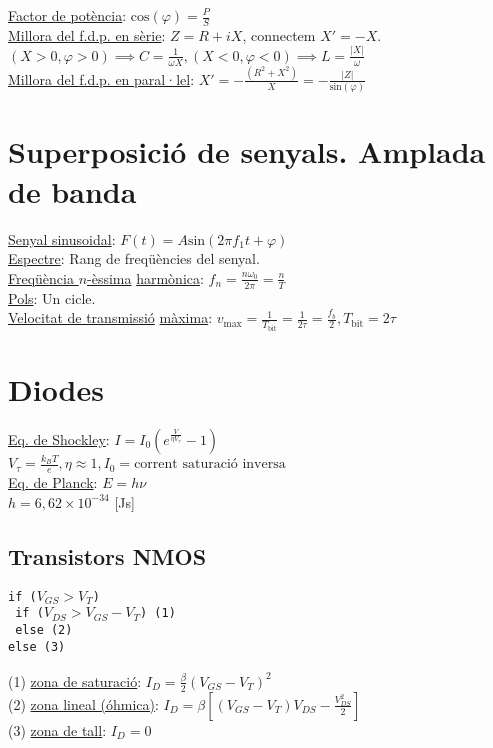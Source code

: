 \documentclass[10pt]{article}
\begin{document}
\begin{multicols}{5}
\underline{Factor de potència}: $\text{cos}(\varphi) = \frac{P}{S}$ \\
\underline{Millora del f.d.p. en sèrie}: $Z = R + iX$, connectem $X' = -X$. $(X>0,\varphi>0) \implies C=\frac{1}{\omega X}, (X<0, \varphi<0) \implies L=\frac{\vert X\vert}{\omega}$ \\
\underline{Millora del f.d.p. en paral·lel}: $X' = -\frac{(R^2+X^2)}{X} = -\frac{\vert Z\vert}{\text{sin}(\varphi)}$

\section{Superposició de senyals. Amplada de banda}

\underline{Senyal sinusoidal}: $F(t) = A\text{sin}(2\pi f_1t+ \varphi)$ \\
\underline{Espectre}: Rang de freqüències del senyal. \\
\underline{Freqüència $n$-èssima} \underline{harmònica}: $f_n = \frac{n\omega_0}{2\pi} = \frac{n}{T}$ \\
\underline{Pols}: Un cicle. \\
\underline{Velocitat de transmissió} \underline{màxima}: $v_\text{max} = \frac{1}{T_\text{bit}} = \frac{1}{2\tau} = \frac{f_b}{2}, T_{\text{bit}} = 2 \tau$ \\






\section{Diodes}

\underline{Eq. de Shockley}: $I = I_0 \left( e^{\frac{V}{\eta V_\tau}} -1 \right)$ \\
$V_\tau = \frac{k_BT}{e}, \eta \approx 1, I_0 = \text{corrent saturació inversa}$ \\
\underline{Eq. de Planck}: $E = h \nu$ \\
$h = 6,62 \times 10^{-34}$ [Js]

\subsection{Transistors NMOS}

\texttt{if ($V_{GS} > V_T$) }\\
\texttt{ if ($V_{DS} > V_{GS} - V_T$) (1)} \\
\texttt{ else (2)} \\
\texttt{else (3)} \\
\texttt{ } \\
(1) \underline{zona de saturació}: $I_D = \frac{\beta}{2} (V_{GS}-V_T)^2$ \\
(2) \underline{zona lineal (óhmica)}: $I_D = \beta \left[ \left( V_{GS} - V_T \right) V_{DS} - \frac{V_{DS}^2}{2} \right]$ \\
(3) \underline{zona de tall}: $I_D = 0$


\end{multicols}
\end{document}

